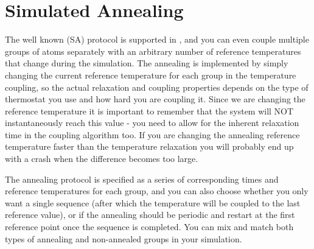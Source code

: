 \section{Simulated Annealing}
\label{sec:SA}
The well known 
(SA) protocol is supported in {\gromacs}, and you can even couple multiple
groups of atoms separately with an arbitrary number of reference temperatures
that change during the simulation. The annealing is implemented by simply 
changing the current reference temperature for each group in the temperature
coupling, so the actual relaxation and coupling properties depends on the
type of thermostat you use and how hard you are coupling it. Since we are
changing the reference temperature it is important to remember that the system
will NOT instantaneously reach this value - you need to allow for the inherent
relaxation time in the coupling algorithm too. If you are changing the 
annealing reference temperature faster than the temperature relaxation you
will probably end up with a crash when the difference becomes too large.

The annealing protocol is specified as a series of corresponding times and 
reference temperatures for each group, and you can also choose whether you only
want a single sequence (after which the temperature will be coupled to the 
last reference value), or if the annealing should be periodic and restart at 
the first reference point once the sequence is completed. You can mix and
match both types of annealing and non-annealed groups in your simulation.

\newcommand{\vrond}{\stackrel{\circ}{\ve{r}}}
\newcommand{\rond}{\stackrel{\circ}{r}}
\newcommand{\ruis}{\ve{r}^G}

